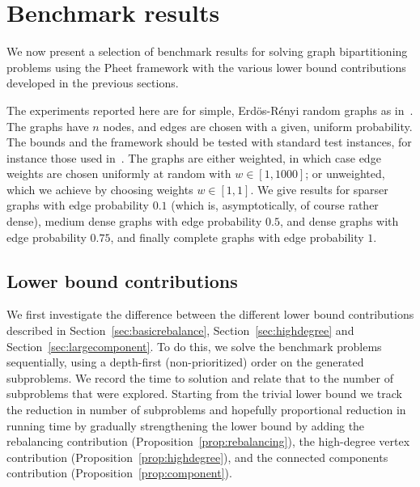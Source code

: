 \documentclass[a4paper,11pt]{article}
\begin{document}
\section{Benchmark results}

We now present a selection of benchmark results for solving graph
bipartitioning problems using the Pheet framework with the various
lower bound contributions developed in the previous sections.

The experiments reported here are for simple, Erd\"os-R\'enyi random
graphs as in~\cite{Wimmer14:diss}. The graphs have $n$ nodes, and
edges are chosen with a given, uniform probability. The bounds and the
framework should be tested with standard test instances, for instance
those used
in~\cite{DellingGoldbergRazenshteynWerneck11,DellingGoldbergRazenshteynWerneck12,DellingWerneck12}. The
graphs are either weighted, in which case edge weights are chosen
uniformly at random with $w\in [1,1000]$; or unweighted, which we
achieve by choosing weights $w\in [1,1]$. We give results for sparser
graphs with edge probability $0.1$ (which is, asymptotically, of
course rather dense), medium dense graphs with edge probability $0.5$,
and dense graphs with edge probability $0.75$, and finally complete
graphs with edge probability $1$.

\subsection{Lower bound contributions}

We first investigate the difference between the different lower bound
contributions described in Section~\ref{sec:basicrebalance},
Section~\ref{sec:highdegree} and Section~\ref{sec:largecomponent}. To
do this, we solve the benchmark problems sequentially, using a
depth-first (non-prioritized) order on the generated subproblems. We
record the time to solution and relate that to the number of
subproblems that were explored.  Starting from the trivial lower bound
we track the reduction in number of subproblems and hopefully
proportional reduction in running time by gradually strengthening the
lower bound by adding the rebalancing contribution
(Proposition~\ref{prop:rebalancing}), the high-degree vertex
contribution (Proposition~\ref{prop:highdegree}), and the connected
components contribution (Proposition~\ref{prop:component}).
\end{document}
